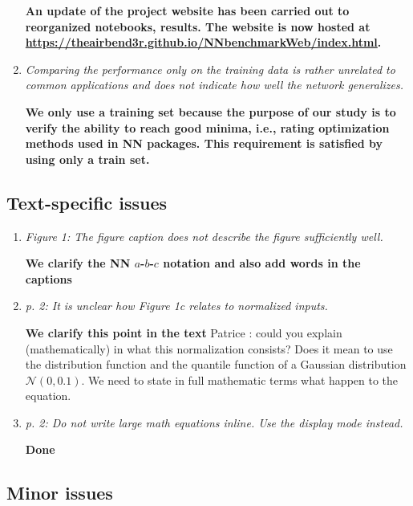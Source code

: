 \documentclass[12pt]{article}
\newcommand{\red}[1]{{\color{red}#1}}
\begin{document}
\begin{enumerate}
\textbf{An update of the project website has been carried out to reorganized notebooks, results.
The website is now hosted at \url{https://theairbend3r.github.io/NNbenchmarkWeb/index.html}.}



\item \textit{Comparing the performance only on the training data is rather unrelated to common applications and does not indicate how well the network generalizes.}

\textbf{We only use a training set because the purpose of our study is to verify the ability to reach good minima, i.e., rating optimization
methods used in NN packages. This requirement is satisfied by using only a train set.}


\end{enumerate}

\subsection*{Text-specific issues}

\begin{enumerate}[resume]
\item \textit{Figure 1: The figure caption does not describe the figure sufficiently well.}

\textbf{We clarify the NN $a$-$b$-$c$ notation and also add words in the captions}

\item \textit{p. 2: It is unclear how Figure 1c relates to normalized inputs.}

\textbf{We clarify this point in the text}
\red{Patrice : could you explain (mathematically) in what this normalization consists? Does it mean to use the distribution
function and the quantile function of a Gaussian distribution $\mathcal N(0,0.1)$. We need to state in full mathematic
terms what happen to the equation.}

\item \textit{p. 2: Do not write large math equations inline. Use the display mode instead.}

\textbf{Done}

\end{enumerate}

\subsection*{Minor issues}
\end{document}
